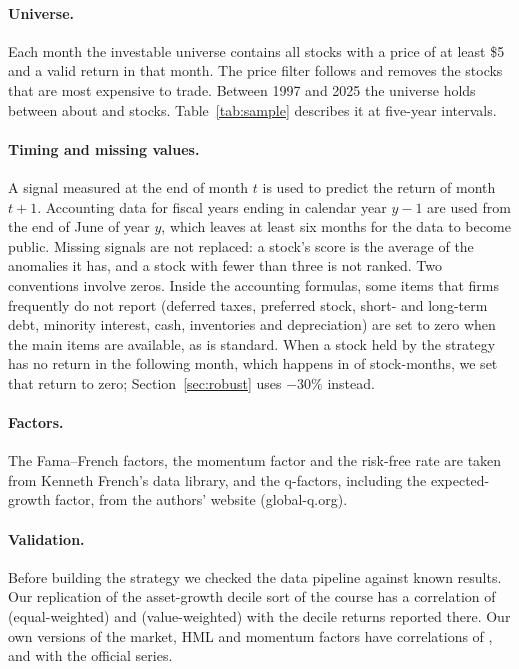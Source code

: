 \documentclass[12pt,a4paper]{article}
\begin{document}
\paragraph{Universe.} Each month the investable universe contains all stocks with a price of at least \$5 and a valid return in that month. The price filter follows \citet{stambaugh2017} and removes the stocks that are most expensive to trade. Between 1997 and 2025 the universe holds between about \universemin{} and \universemax{} stocks. Table~\ref{tab:sample} describes it at five-year intervals.

\paragraph{Timing and missing values.} A signal measured at the end of month $t$ is used to predict the return of month $t+1$. Accounting data for fiscal years ending in calendar year $y-1$ are used from the end of June of year $y$, which leaves at least six months for the data to become public. Missing signals are not replaced: a stock's score is the average of the anomalies it has, and a stock with fewer than three is not ranked. Two conventions involve zeros. Inside the accounting formulas, some items that firms frequently do not report (deferred taxes, preferred stock, short- and long-term debt, minority interest, cash, inventories and depreciation) are set to zero when the main items are available, as is standard. When a stock held by the strategy has no return in the following month, which happens in \impfill{} of \nstockmonths{} stock-months, we set that return to zero; Section~\ref{sec:robust} uses $-30\%$ instead.

\paragraph{Factors.} The Fama--French factors, the momentum factor and the risk-free rate are taken from Kenneth French's data library, and the q-factors, including the expected-growth factor, from the authors' website (global-q.org).

\paragraph{Validation.} Before building the strategy we checked the data pipeline against known results. Our replication of the asset-growth decile sort of the course \citep{goyal2026} has a correlation of \valew{} (equal-weighted) and \valvw{} (value-weighted) with the decile returns reported there. Our own versions of the market, HML and momentum factors have correlations of \valmkt, \valhml{} and \valumd{} with the official series.
\end{document}
